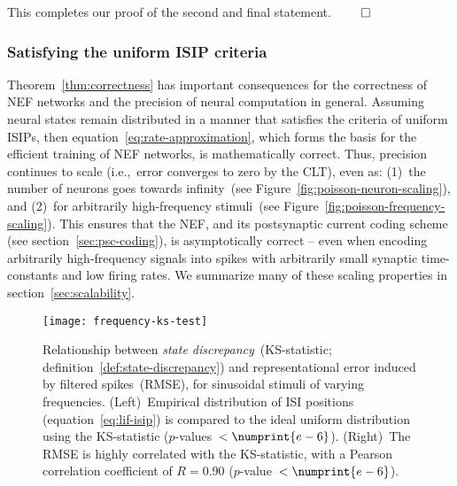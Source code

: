 This completes our proof of the second and final statement. $\hfill \qed$

\subsubsection{Satisfying the uniform ISIP criteria}

Theorem~\ref{thm:correctness} has important consequences for the correctness of NEF networks and the precision of neural computation in general.
Assuming neural states remain distributed in a manner that satisfies the criteria of uniform ISIPs, then equation~\ref{eq:rate-approximation}, which forms the basis for the efficient training of NEF networks, is mathematically correct.
Thus, precision continues to scale (i.e.,~error converges to zero by the CLT), even as:
(1)~the number of neurons goes towards infinity~(see Figure~\ref{fig:poisson-neuron-scaling}), and
(2)~for arbitrarily high-frequency stimuli~(see Figure~\ref{fig:poisson-frequency-scaling}).
This ensures that the NEF, and its postsynaptic current coding scheme (see section~\ref{sec:psc-coding}), is asymptotically correct -- even when encoding arbitrarily high-frequency signals into spikes with arbitrarily small synaptic time-constants and low firing rates.
We summarize many of these scaling properties in section~\ref{sec:scalability}.

\begin{figure}[h!]
\centering
\texttt{[image: frequency-ks-test]}
\caption{\label{fig:frequency-ks-test}
  Relationship between \emph{state discrepancy}~(KS-statistic; definition~\ref{def:state-discrepancy}) and representational error induced by filtered spikes~(RMSE), for sinusoidal stimuli of varying frequencies.
  (Left)~Empirical distribution of ISI positions (equation~\ref{eq:lif-isip}) is compared to the ideal uniform distribution using the KS-statistic ($p$-values~$< \numprint{e-6}$).
  (Right)~The RMSE is highly correlated with the KS-statistic, with a Pearson correlation coefficient of $R = 0.90$ ($p$-value~$< \numprint{e-6}$).
}
\end{figure}

